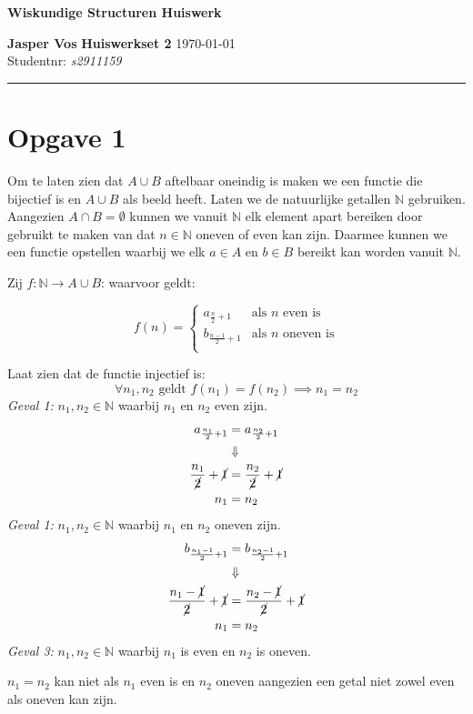 \documentclass{article}
\begin{document}
{\Large \textbf{Wiskundige Structuren Huiswerk}}

\bigskip

\textbf{Jasper Vos} \hfill \textbf{Huiswerkset 2} \hfill \today \\
Studentnr: \emph{s2911159} 

\rule{\textwidth}{2pt}

\bigskip

\newcommand{\N}{\mathbb{N}}
\newcommand{\f}[2]{\frac{#1}{#2}}
\newcommand{\tx}[1]{\text{#1}}
\newcommand{\cn}[1]{\cancel{#1}}
\newcommand{\R}{\mathbb{R}}

\section*{Opgave 1}
Om te laten zien dat $A \cup B$ aftelbaar oneindig is maken we een functie die bijectief is en $A \cup B$ als beeld heeft.
Laten we de natuurlijke getallen $\N$ gebruiken. Aangezien $A \cap B = \emptyset$ kunnen we vanuit $\N$ elk element apart bereiken door gebruikt te maken van dat $n \in \N$ oneven of even kan zijn.
Daarmee kunnen we een functie opstellen waarbij we elk $a \in A \tx{ en } b \in B$ bereikt kan worden vanuit $\N$.

\bigskip

Zij $f:\N \rightarrow A \cup B$: waarvoor geldt:

\[
f(n) = \begin{cases}
    a_{\f{n}{2} + 1} & \tx{als $n$ even is} \\
    b_{\f{n-1}{2} + 1} & \tx{als $n$ oneven is} \\
\end{cases}
\]

Laat zien dat de functie injectief is: 
    \[\forall n_1, n_2 \tx{ geldt } f(n_1) = f(n_2) \implies n_1 = n_2 \]
\emph{Geval 1:} $n_1, n_2 \in \N$ waarbij $n_1$ en $n_2$ even zijn.  
\begin{align*}
    a_{\f{n_1}{2}+1} &= a_{\f{n_2}{2}+ 1} \\
    &\Downarrow \\
    \f{n_1}{\cn{2}} + \cn{1} &= \f{n_2}{\cn{2}} + \cn{1} \\
    n_1 &= n_2 \\
\end{align*}
\emph{Geval 1:} $n_1, n_2 \in \N$ waarbij $n_1$ en $n_2$ oneven zijn.  
\begin{align*}
    b_{\f{n_1-1}{2}+1} &= b_{\f{n_2 - 1}{2}+ 1} \\
    &\Downarrow \\
    \f{n_1 - \cn{1}}{\cn{2}} + \cn{1} &= \f{n_2 - \cn{1}}{\cn{2}} + \cn{1} \\
    n_1 &= n_2 \\
\end{align*}
\emph{Geval 3:} $n_1, n_2 \in \N$ waarbij $n_1$ is even en $n_2$ is oneven.
\begin{center}
    $n_1 = n_2$ kan niet als $n_1$ even is en $n_2$ oneven aangezien een getal niet zowel even als oneven kan zijn. 
\end{center}
\end{document}
